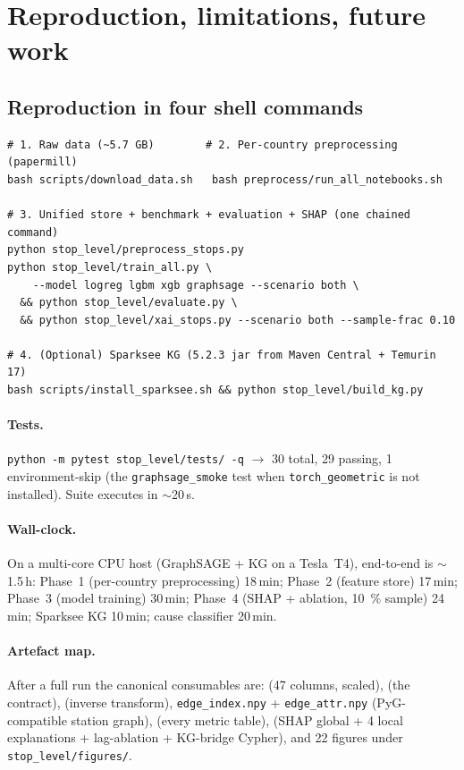 \section{Reproduction, limitations, future work}
\label{sec:repro}

\subsection{Reproduction in four shell commands}

\begin{verbatim}
# 1. Raw data (~5.7 GB)        # 2. Per-country preprocessing (papermill)
bash scripts/download_data.sh   bash preprocess/run_all_notebooks.sh

# 3. Unified store + benchmark + evaluation + SHAP (one chained command)
python stop_level/preprocess_stops.py
python stop_level/train_all.py \
    --model logreg lgbm xgb graphsage --scenario both \
  && python stop_level/evaluate.py \
  && python stop_level/xai_stops.py --scenario both --sample-frac 0.10

# 4. (Optional) Sparksee KG (5.2.3 jar from Maven Central + Temurin 17)
bash scripts/install_sparksee.sh && python stop_level/build_kg.py
\end{verbatim}

\paragraph{Tests.} \texttt{python -m pytest stop\_level/tests/ -q} $\to$ 30 total, 29 passing, 1 environment-skip (the \texttt{graphsage\_smoke} test when \texttt{torch\_geometric} is not installed). Suite executes in $\sim$20\,s.

\paragraph{Wall-clock.} On a multi-core CPU host (GraphSAGE + KG on a Tesla~T4), end-to-end is $\sim$1.5\,h: Phase~1 (per-country preprocessing) 18\,min; Phase~2 (feature store) 17\,min; Phase~3 (model training) 30\,min; Phase~4 (SHAP + ablation, \SI{10}{\percent} sample) 24\,min; Sparksee KG 10\,min; cause classifier 20\,min.

\paragraph{Artefact map.} After a full run the canonical consumables are: \texttt{} (47 columns, scaled), \texttt{} (the contract), \texttt{} (inverse transform), \texttt{edge\_index.npy} + \texttt{edge\_attr.npy} (PyG-compatible station graph), \texttt{} (every metric table), \texttt{} (SHAP global + 4 local explanations + lag-ablation + KG-bridge Cypher), and 22 figures under \texttt{stop\_level/figures/}.


